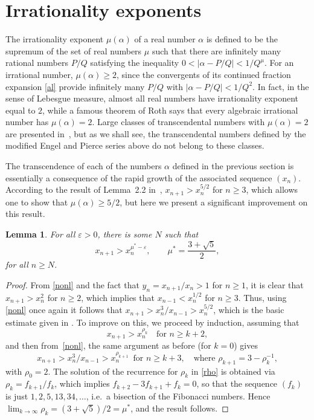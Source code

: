 \documentclass[10pt, a4paper]{amsart}
\numberwithin{equation}{section}
\newcommand\al{{\alpha}}
\newcommand\eps{\varepsilon}
\theoremstyle{plain}
\newtheorem{lem}[thm]{Lemma}
\theoremstyle{definition}
\begin{document}
\section{Irrationality exponents }
\label{sec:exponents}

The irrationality exponent $\mu(\al)$ of a real number $\al$ is defined to be the 
supremum of the set of real numbers $\mu$ such that there are  infinitely many 
rational numbers $P/Q$ satisfying the  inequality 
$0<|\al - P/Q|<1/Q^\mu$. For an irrational number, $\mu(\al)\geq 2$, since 
the convergents of its continued fraction expansion \eqref{al} provide 
infinitely many $P/Q$ with $|\al - P/Q|<1/Q^2$. In fact, in the sense 
of Lebesgue measure, almost all real numbers 
have irrationality exponent equal to $2$, while a famous theorem 
of Roth \cite{Roth} says that every algebraic irrational number 
has $\mu(\al)=2$. Large classes of transcendental numbers with $\mu(\al)=2$ 
are presented in~\cite{bugeaudetal}, but as we shall see, the 
transcendental numbers defined by the modified 
Engel and Pierce series above do not belong to these classes.  

The transcendence of each of the numbers $\al$ defined  in the previous section 
is essentially a consequence of the rapid growth of the associated sequence $(x_n)$.  
According to the result of Lemma~2.2 in~\cite{Hone3}, 
$x_{n+1}>x_n^{5/2}$ for $n\geq3$,  which allows one to show that 
$\mu(\al)\geq 5/2$, but here  
we present a significant improvement on this result. 

\begin{lem} For all $\eps>0$, there is some $N$ such that   
\begin{equation}
\label{xbd} 
x_{n+1}>x_n^{\mu^* -\eps}, \qquad \mu^*=\frac{3+\sqrt{5}}{2}, 
\end{equation} 
for all $n\geq N$. 
\end{lem} 

\begin{proof}
From \eqref{nonl} and the fact that $y_n = x_{n+1}/x_n>1$ for $n\geq 1$, 
it is clear that $x_{n+1}>x_n^2$ for $n\geq 2$, which implies that 
$x_{n-1}<x_n^{1/2}$ for $n\geq 3$. Thus,  using \eqref{nonl} once again 
it follows that $x_{n+1}>x_n^3/x_{n-1}>x_n^{5/2}$, which 
is the basic estimate given in \cite{Hone1, Hone3}. To improve on 
this, we proceed by induction, assuming that 
\[ 
x_{n+1}>x_n^{\rho_k}\quad \text{for} \,\, n\geq k+2, 
\]
and then from~\eqref{nonl}, the same argument as before (for $k=0$) 
gives  
\begin{equation}
\label{rho} 
x_{n+1}>x_n^3/x_{n-1}>x_n^{\rho_{k+1}} 
\,\,\,\text{for} \,\, n\geq k+3, \quad 
\text{where} \,\, \rho_{k+1}=3-\rho_k^{-1},
\end{equation} 
with $\rho_0=2$. 
The solution of the recurrence for 
$\rho_k$ in \eqref{rho} is obtained via 
$\rho_k=f_{k+1}/f_k$, which implies $f_{k+2}-3f_{k+1}+f_k=0$,  
so that the sequence $(f_k)$ is just $1,2,5,13,34,\ldots$, i.e.\ 
a bisection of the Fibonacci numbers. Hence 
$\lim_{k\to\infty}\rho_k = (3+\sqrt{5})/2=\mu^*$, and the 
result follows. 
\end{proof}  
\end{document}
